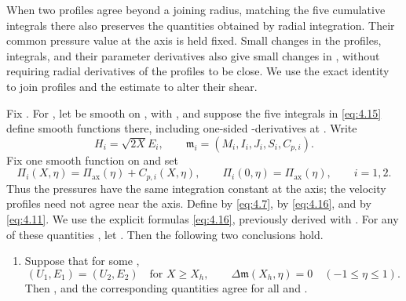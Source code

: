 When two profiles agree beyond a joining radius, matching the five cumulative
integrals there also preserves the quantities obtained by radial integration.
Their common pressure value at the axis is held fixed. Small changes in the
profiles, integrals, and their parameter derivatives also give small changes
in , without requiring radial derivatives of
the profiles to be close. We use the exact identity to join profiles and the
estimate to alter their shear.

\begin{lemma}\label{lem:4.4}
Fix . For
, let  be smooth on
, with
, and suppose the five integrals in
\eqref{eq:4.15} define smooth functions there, including one-sided
-derivatives at
. Write
\[
 H_i=\sqrt{2X}E_i,\qquad
 \mathfrak m_i=(M_i,I_i,J_i,S_i,C_{p,i}).
\]
Fix one smooth function  on
 and set
\[
 \Pi_i(X,\eta)=\Pi_{\mathrm{ax}}(\eta)+C_{p,i}(X,\eta),
 \qquad
 \Pi_i(0,\eta)=\Pi_{\mathrm{ax}}(\eta),
 \qquad i=1,2.
\]
Thus the pressures have the same integration constant at the axis; the
velocity profiles need not agree near the axis. Define
 by \eqref{eq:4.7},
 by \eqref{eq:4.16}, and
 by
\eqref{eq:4.11}. We use the explicit formulas \eqref{eq:4.16}, previously
derived with . For any of these quantities
, let
. Then the following two conclusions
hold.
%
\begin{enumerate}[label=\textup{(\roman*)},leftmargin=2.5em]
\item Suppose that for some ,
\[
 (U_1,E_1)=(U_2,E_2)\quad\text{for }X\geq X_h,
 \qquad
 \Delta\mathfrak m(X_h,\eta)=0\quad(-1\leq\eta\leq1).
\]
Then , and the corresponding
quantities
 agree for all  and
.


\end{enumerate}
\end{lemma}
